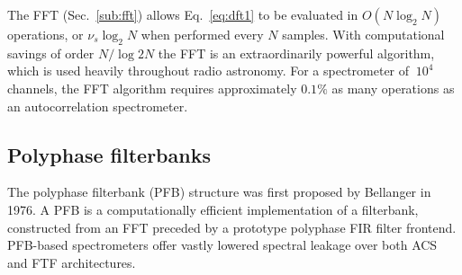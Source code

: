 \documentclass{ws-rv961x669}
\begin{document}
The FFT (Sec.~\ref{sub:fft}) allows Eq.~\ref{eq:dft1} to be evaluated in $O(N\log_2N)$ operations, or $\nu_s\log_2N$ when performed every $N$ samples. With computational savings of order $N / \log2{N}$ the FFT is an extraordinarily powerful algorithm, which is used heavily throughout radio astronomy. For a spectrometer of $~10^4$ channels, the FFT algorithm requires approximately $0.1\%$ as many operations as an autocorrelation spectrometer.


\subsection{Polyphase filterbanks}\label{sub:pfb}

The polyphase filterbank (PFB) structure\citet{Bellanger:1976p7898, Harris2011} was first proposed by Bellanger in 1976. A PFB is a computationally efficient implementation of a filterbank, constructed from an FFT preceded by a prototype polyphase FIR filter frontend. PFB-based spectrometers offer vastly lowered spectral leakage over both ACS and FTF architectures. 
\end{document}
